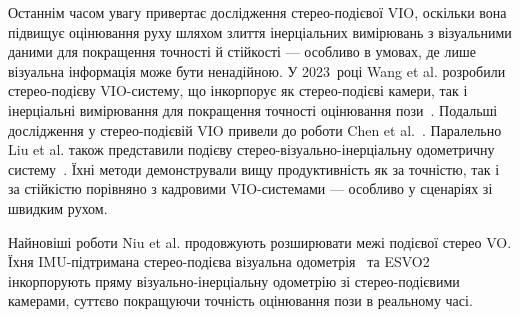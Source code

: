 Останнім часом увагу привертає дослідження стерео-подієвої VIO, оскільки вона підвищує оцінювання руху шляхом злиття інерціальних вимірювань з візуальними даними для покращення точності й стійкості — особливо в умовах, де лише візуальна інформація може бути ненадійною.
У 2023~році Wang et al. розробили стерео-подієву VIO-систему, що інкорпорує як стерео-подієві камери, так і інерціальні вимірювання для покращення точності оцінювання пози~\cite{wang2023stereo}.
Подальші дослідження у стерео-подієвій VIO привели до роботи Chen et al.~\cite{chen2023esvio}.
Паралельно Liu et al. також представили подієву стерео-візуально-інерціальну одометричну систему~\cite{liu2023esvio}.
Їхні методи демонстрували вищу продуктивність як за точністю, так і за стійкістю порівняно з кадровими VIO-системами — особливо у сценаріях зі швидким рухом.

Найновіші роботи Niu et al. продовжують розширювати межі подієвої стерео VO. Їхня IMU-підтримана стерео-подієва візуальна одометрія~\cite{niu2024imu} та ESVO2~\cite{niu2024esvo2} інкорпорують пряму візуально-інерціальну одометрію зі стерео-подієвими камерами, суттєво покращуючи точність оцінювання пози в реальному часі.

\begin{table}[t]
\centering
\caption{Набори даних з подієвими камерами, що стосуються одометрії.}
\label{tab:event-odom-dataset}
\end{table}

